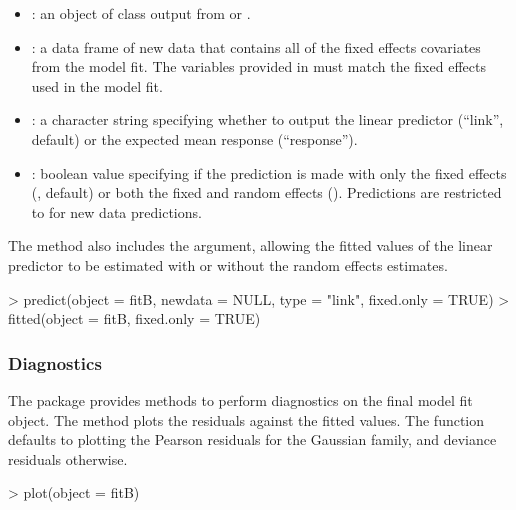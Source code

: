 \begin{itemize}
\item
  : an object of class  output from
   or .
\item
  : a data frame of new data that contains all of the
  fixed effects covariates from the model fit. The variables provided in
   must match the fixed effects used in the model fit.
\item
  : a character string specifying whether to output the
  linear predictor (``link'', default) or the expected mean response
  (``response'').
\item
  : boolean value specifying if the prediction is
  made with only the fixed effects (, default) or both the
  fixed and random effects (). Predictions are restricted
  to  for new data predictions.
\end{itemize}

The  method also includes the 
argument, allowing the fitted values of the linear predictor to be
estimated with or without the random effects estimates.

\begin{example}
> predict(object = fitB, newdata = NULL, type = "link", fixed.only = TRUE)
> fitted(object = fitB, fixed.only = TRUE)
\end{example}


\subsubsection{Diagnostics}
\label{sec:diagnostics}

The  package provides methods to perform diagnostics on the final model fit object. The  method plots the residuals against the fitted values. The  function defaults to plotting the Pearson residuals
for the Gaussian family, and deviance residuals otherwise.
\begin{example}
> plot(object = fitB)
\end{example}

